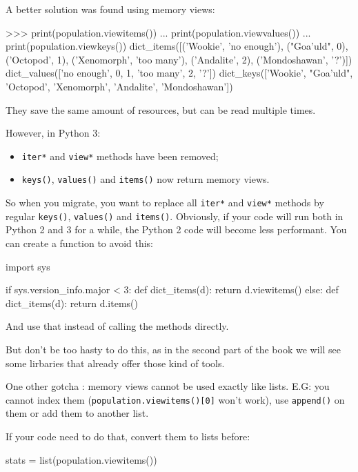 A better solution was found using memory views:

\begin{py2}
>>> print(population.viewitems())
... print(population.viewvalues())
... print(population.viewkeys())
dict_items([('Wookie', 'no enough'), ("Goa'uld", 0), ('Octopod', 1), ('Xenomorph', 'too many'), ('Andalite', 2), ('Mondoshawan', '?')])
dict_values(['no enough', 0, 1, 'too many', 2, '?'])
dict_keys(['Wookie', "Goa'uld", 'Octopod', 'Xenomorph', 'Andalite', 'Mondoshawan'])

\end{py2}

They save the same amount of resources, but can be read multiple times.

However, in Python 3:

\begin{itemize}
    \item \lstinline{iter*} and \lstinline{view*} methods have been removed;
    \item \lstinline{keys()}, \lstinline{values()} and \lstinline{items()} now return memory views.
\end{itemize}

So when you migrate, you want to replace all \lstinline{iter*} and \lstinline{view*} methods by regular \lstinline{keys()}, \lstinline{values()} and \lstinline{items()}. Obviously, if your code will run both in Python 2 and 3 for a while, the Python 2 code will become less performant. You can create a function to avoid this:

\begin{py2and3}
import sys

if sys.version_info.major < 3:
    def dict_items(d):
        return d.viewitems()
else:
    def dict_items(d):
        return d.items()
\end{py2and3}

And use that instead of calling the methods directly.

But don't be too hasty to do this, as in the second part of the book we will see some lirbaries that already offer those kind of tools.

One other gotcha : memory views cannot be used exactly like lists. E.G: you cannot index them (\lstinline{population.viewitems()[0]} won't work), use \lstinline{append()} on them or add them to another list.

If your code need to do that, convert them to lists before:

\begin{py3}
stats = list(population.viewitems())
\end{py3}

